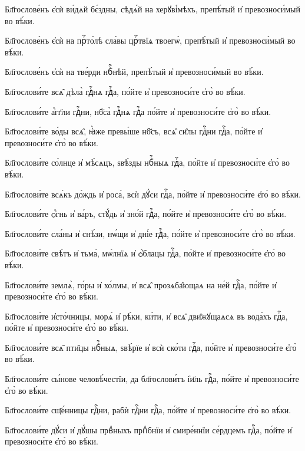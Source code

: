 \hKv Бл҃гослове́нъ є҆сѝ ви́дѧй бє́здны, сѣдѧ́й на  херꙋві́мѣхъ, препѣ́тый и҆ превозноси́мый во вѣ́ки. 
%

\hKv Бл҃гослове́нъ є҆сѝ на прⷭ҇то́лѣ сла́вы црⷭ҇твїѧ  твоегѡ̀, препѣ́тый и҆ превозноси́мый во вѣ́ки. 

\hKv Бл҃гослове́нъ є҆сѝ на тве́рди нбⷭ҇нѣй, препѣ́тый и҆  превозноси́мый во вѣ́ки. 
%


\hKv Бл҃гослови́те всѧ̑ дѣла̀ гдⷭ҇нѧ гдⷭ҇а, по́йте и҆  превозноси́те є҆го̀ во вѣ́ки. 

\hKv Бл҃гослови́те а҆́гг҃ли гдⷭ҇ни, нб҃са̀ гдⷭ҇нѧ гдⷭ҇а по́йте и҆  превозноси́те є҆го̀ во вѣ́ки. 

\hKv Бл҃гослови́те во́ды всѧ̑, ꙗ҆̀же превы́ше нб҃съ, всѧ̑ си̑лы  гдⷭ҇ни гдⷭ҇а, по́йте и҆ превозноси́те є҆го̀ во вѣ́ки. 

\hKv Бл҃гослови́те со́лнце и҆ мѣ́сѧцъ, ѕвѣ́зды нбⷭ҇ныѧ гдⷭ҇а,  по́йте и҆ превозноси́те є҆го̀ во вѣ́ки.  
%

\hKv Бл҃гослови́те всѧ́къ до́ждь и҆ роса̀, всѝ дꙋ́си  гдⷭ҇а, по́йте и҆ превозноси́те є҆го̀ во вѣ́ки. 

\hKv Бл҃гослови́те ѻ҆́гнь и҆ ва́ръ, стꙋ́дь и҆ зно́й гдⷭ҇а,  по́йте и҆ превозноси́те є҆го̀ во вѣ́ки.  

\hKv Бл҃гослови́те сла́ны и҆ снѣ́зи, нѡ́щи и҆ дні́е гдⷭ҇а,  по́йте и҆ превозноси́те є҆го̀ во вѣ́ки. 

\hKv Бл҃гослови́те свѣ́тъ и҆ тьма̀, мѡ́лнїѧ и҆ ѻ҆́блацы гдⷭ҇а,  по́йте и҆ превозноси́те є҆го̀ во вѣ́ки. 

\hKv Бл҃гослови́те землѧ̀, го́ры и҆ хо́лмы, и҆ всѧ̑ прозѧба̑ющаѧ  на не́й гдⷭ҇а, по́йте и҆ превозноси́те є҆го̀ во вѣ́ки. 

\hKv Бл҃гослови́те и҆сто́чницы, морѧ̀ и҆ рѣ́ки, ки́ти, и҆ всѧ̑  дви̑жꙋщаѧсѧ въ вода́хъ гдⷭ҇а, по́йте и҆ превозноси́те є҆го̀  во вѣ́ки. 
%

\hKv Бл҃гослови́те всѧ̑ пти̑цы нбⷭ҇ныѧ, ѕвѣ́рїе и҆ всѝ  ско́ти гдⷭ҇а, по́йте и҆ превозноси́те є҆го̀ во вѣ́ки.  

\hKv Бл҃гослови́те сы́нове человѣ́честїи, да бл҃гослови́тъ  і҆и҃ль гдⷭ҇а, по́йте и҆ превозноси́те є҆го̀ во вѣ́ки. 
%

\hKv Бл҃гослови́те сщ҃е́нницы гдⷭ҇ни, рабѝ гдⷭ҇ни гдⷭ҇а,  по́йте и҆ превозноси́те є҆го̀ во вѣ́ки. 

\hKv Бл҃гослови́те дꙋ́си и҆ дꙋ́шы првⷣныхъ прпⷣбнїи и҆  смире́ннїи се́рдцемъ гдⷭ҇а, по́йте и҆ превозноси́те є҆го̀  во вѣ́ки. 
%

